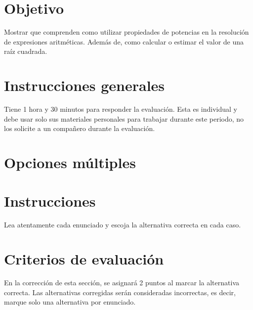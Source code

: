 \documentclass[]{srs}
\begin{document}
\section*{Objetivo}

Mostrar que comprenden como utilizar propiedades de potencias en la resolución
de expresiones aritméticas. Además de, como calcular o estimar el valor de
una raíz cuadrada.

\section*{Instrucciones generales}
  Tiene 1 hora y 30 minutos para responder la evaluación. Esta es individual y debe
  usar solo sus materiales personales para trabajar durante este periodo, no los solicite
  a un compañero durante la evaluación.

\section{Opciones múltiples}

\section*{Instrucciones}
Lea atentamente cada enunciado y escoja la alternativa correcta en cada caso.

\section*{Criterios de evaluación}
En la corrección de esta sección, se asignará 2 puntos al marcar la alternativa correcta.
Las alternativas corregidas serán consideradas incorrectas, es decir, marque solo una
alternativa por enunciado.

\separador[2mm]
\end{document}
